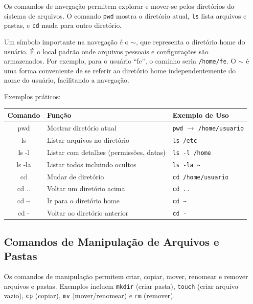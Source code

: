 \documentclass[12pt]{article}
\begin{document}
Os comandos de navegação permitem explorar e mover-se pelos diretórios do sistema de arquivos. O comando \texttt{pwd} mostra o diretório atual, \texttt{ls} lista arquivos e pastas, e \texttt{cd} muda para outro diretório.

Um símbolo importante na navegação é o $\sim$, que representa o diretório home do usuário. É o local padrão onde arquivos pessoais e configurações são armazenados. Por exemplo, para o usuário ``fe'', o caminho seria \texttt{/home/fe}. O $\sim$ é uma forma conveniente de se referir ao diretório home independentemente do nome do usuário, facilitando a navegação.

Exemplos práticos:

\begin{cmdbox}
\begin{tabularx}{\linewidth}{@{}C >{\raggedright\arraybackslash}X >{\raggedright\arraybackslash}X@{}}
\toprule
\textbf{Comando} & \textbf{Função} & \textbf{Exemplo de Uso} \\
\midrule
pwd & Mostrar diretório atual & \texttt{pwd} $\rightarrow$ \texttt{/home/usuario} \\
ls & Listar arquivos no diretório & \texttt{ls /etc} \\
ls -l & Listar com detalhes (permissões, datas) & \texttt{ls -l /home} \\
ls -la & Listar todos incluindo ocultos & \texttt{ls -la \~{}} \\
cd & Mudar de diretório & \texttt{cd /home/usuario} \\
cd .. & Voltar um diretório acima & \texttt{cd ..} \\
cd \~{} & Ir para o diretório home & \texttt{cd \~{}} \\
cd - & Voltar ao diretório anterior & \texttt{cd -} \\
\bottomrule
\end{tabularx}
\end{cmdbox}

\subsection{Comandos de Manipulação de Arquivos e Pastas}

Os comandos de manipulação permitem criar, copiar, mover, renomear e remover arquivos e pastas. Exemplos incluem \texttt{mkdir} (criar pasta), \texttt{touch} (criar arquivo vazio), \texttt{cp} (copiar), \texttt{mv} (mover/renomear) e \texttt{rm} (remover).
\end{document}
